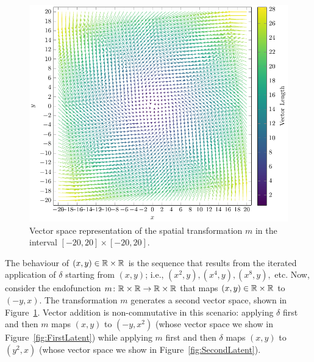   \begin{figure}[t]
    \centering  
    \includegraphics[width=\textwidth]{Figures/VectorSpace2.pdf} 
    \caption{Vector space representation of the spatial transformation $m$ in the interval $[-20,20]\times[-20,20]$.} 
    \label{fig:SpatialDeformation} 
\end{figure} 
The behaviour of $(x,y)\in \mathbb{R}\times\mathbb{R}$ is the sequence that results from the iterated application of $\delta$ starting from $(x,y)$; i.e., $(x^2,y),(x^4,y),(x^8,y),$ etc. Now, consider the endofunction $m\colon \mathbb{R}\times\mathbb{R}\rightarrow \mathbb{R}\times\mathbb{R}$ that maps $(x,y)\in \mathbb{R}\times\mathbb{R}$ to $(-y,x)$. The transformation $m$ generates a second vector space, shown in Figure~\ref{fig:SpatialDeformation}. Vector addition is non-commutative in this scenario: applying $\delta$ first and then $m$ maps $(x,y)$ %
to $(-y,x^2)$ (whose vector space we show in Figure~\ref{fig:FirstLatent}) while applying $m$ first and then $\delta$ maps $(x,y)$ to $(y^2,x)$ (whose vector space we show in Figure~\ref{fig:SecondLatent}). %

